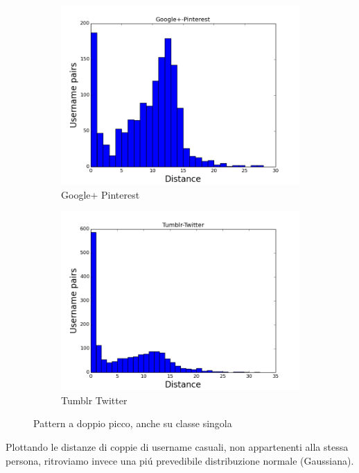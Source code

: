 \begin{figure}
\begin{subfigure}{.5\textwidth}
  \centering
  \includegraphics[width=.8\linewidth]{chapters/distanceplot/Google+-Pinterest.png}
  \caption{Google+ Pinterest}
  \label{fig:sfig1}
\end{subfigure}%
\begin{subfigure}{.5\textwidth}
  \centering
  \includegraphics[width=.8\linewidth]{chapters/distanceplot/Tumblr-Twitter.png}
  \caption{Tumblr Twitter}
  \label{fig:sfig2}
\end{subfigure}
\caption{Pattern a doppio picco, anche su classe singola}
\label{fig:fig}
\end{figure}




Plottando le distanze di coppie di username casuali, non appartenenti alla stessa persona, ritroviamo invece una piú prevedibile distribuzione normale (Gaussiana).

